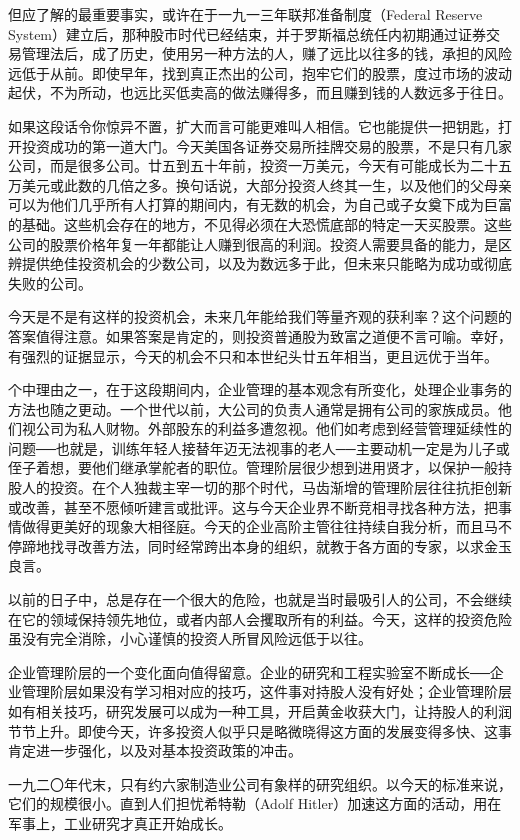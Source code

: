 \documentclass[UTF8,a4paper,zihao=-4,fontset = windows]{ctexart} %
\begin{document}
但应了解的最重要事实，或许在于一九一三年联邦准备制度（Federal Reserve System）建立后，那种股市时代已经结束，并于罗斯福总统任内初期通过证券交易管理法后，成了历史，使用另一种方法的人，赚了远比以往多的钱，承担的风险远低于从前。即使早年，找到真正杰出的公司，抱牢它们的股票，度过市场的波动起伏，不为所动，也远比买低卖高的做法赚得多，而且赚到钱的人数远多于往日。

如果这段话令你惊异不置，扩大而言可能更难叫人相信。它也能提供一把钥匙，打开投资成功的第一道大门。今天美国各证券交易所挂牌交易的股票，不是只有几家公司，而是很多公司。廿五到五十年前，投资一万美元，今天有可能成长为二十五万美元或此数的几倍之多。换句话说，大部分投资人终其一生，以及他们的父母亲可以为他们几乎所有人打算的期间内，有无数的机会，为自己或子女奠下成为巨富的基础。这些机会存在的地方，不见得必须在大恐慌底部的特定一天买股票。这些公司的股票价格年复一年都能让人赚到很高的利润。投资人需要具备的能力，是区辨提供绝佳投资机会的少数公司，以及为数远多于此，但未来只能略为成功或彻底失败的公司。

今天是不是有这样的投资机会，未来几年能给我们等量齐观的获利率？这个问题的答案值得注意。如果答案是肯定的，则投资普通股为致富之道便不言可喻。幸好，有强烈的证据显示，今天的机会不只和本世纪头廿五年相当，更且远优于当年。

个中理由之一，在于这段期间内，企业管理的基本观念有所变化，处理企业事务的方法也随之更动。一个世代以前，大公司的负责人通常是拥有公司的家族成员。他们视公司为私人财物。外部股东的利益多遭忽视。他们如考虑到经营管理延续性的问题──也就是，训练年轻人接替年迈无法视事的老人──主要动机一定是为儿子或侄子着想，要他们继承掌舵者的职位。管理阶层很少想到进用贤才，以保护一般持股人的投资。在个人独裁主宰一切的那个时代，马齿渐增的管理阶层往往抗拒创新或改善，甚至不愿倾听建言或批评。这与今天企业界不断竞相寻找各种方法，把事情做得更美好的现象大相径庭。今天的企业高阶主管往往持续自我分析，而且马不停蹄地找寻改善方法，同时经常跨出本身的组织，就教于各方面的专家，以求金玉良言。

以前的日子中，总是存在一个很大的危险，也就是当时最吸引人的公司，不会继续在它的领域保持领先地位，或者内部人会攫取所有的利益。今天，这样的投资危险虽没有完全消除，小心谨慎的投资人所冒风险远低于以往。

企业管理阶层的一个变化面向值得留意。企业的研究和工程实验室不断成长──企业管理阶层如果没有学习相对应的技巧，这件事对持股人没有好处；企业管理阶层如有相关技巧，研究发展可以成为一种工具，开启黄金收获大门，让持股人的利润节节上升。即使今天，许多投资人似乎只是略微晓得这方面的发展变得多快、这事肯定进一步强化，以及对基本投资政策的冲击。

一九二〇年代末，只有约六家制造业公司有象样的研究组织。以今天的标准来说，它们的规模很小。直到人们担忧希特勒（Adolf Hitler）加速这方面的活动，用在军事上，工业研究才真正开始成长。
\end{document}
